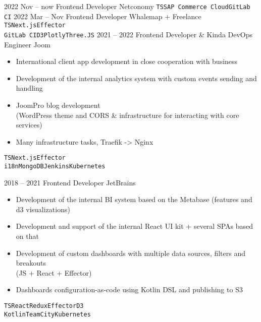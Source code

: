 \documentclass[10pt]{template}
\begin{document}
\begin{entrylist}
    \entry
	{2022 Nov -- now}
	{Frontend Developer}
	{Netconomy}
	{
		\texttt{TS}\slashsep\texttt{SAP Commerce Cloud}\slashsep\texttt{GitLab CI}}
    \entry
	{2022 Mar -- Nov}
	{Frontend Developer}
	{Whalemap + Freelance}
	{
		\texttt{TS}\slashsep\texttt{Next.js}\slashsep\texttt{Effector}\\
		{\color{gray}\texttt{GitLab CI}\slashsep\texttt{D3}\slashsep\texttt{Plotly}\slashsep\texttt{Three.JS}}}
	\entry
	{2021 -- 2022}
	{Frontend Developer \& Kinda DevOps Engineer}
	{Joom}
	{
	        \begin{itemize}[noitemsep,topsep=5pt,leftmargin=8pt]
		        \item International client app development in close cooperation with business
		        \item Development of the internal analytics system with custom events sending and handling
			\item JoomPro blog development\\ (WordPress theme and CORS \& infrastructure for interacting with core services)
		        \item Many infrastructure tasks, Traefik -> Nginx
		\end{itemize}
		\texttt{TS}\slashsep\texttt{Next.js}\slashsep\texttt{Effector}\\
		{\color{gray}\texttt{i18n}\slashsep\texttt{MongoDB}\slashsep\texttt{Jenkins}\slashsep\texttt{Kubernetes}}}
	\entry
	{2018 -- 2021}
	{Frontend Developer}
	{JetBrains}
	{
	        \begin{itemize}[noitemsep,topsep=5pt,leftmargin=8pt]
		        \item Development of the internal BI system based on the Metabase (features and d3 visualizations)
		        \item Development and support of the internal React UI kit + several SPAs based on that
		        \item Development of custom dashboards with multiple data sources, filters and breakouts\\ (JS + React + Effector)\\ 
		        \item Dashboards configuration-as-code using Kotlin DSL and publishing to S3
		\end{itemize}
		\texttt{TS}\slashsep\texttt{React}\slashsep\texttt{Redux}\slashsep\texttt{Effector}\slashsep\texttt{D3}\\
		{\color{gray} \texttt{Kotlin}\slashsep\texttt{TeamCity}\slashsep\texttt{Kubernetes}}}
\end{entrylist}
\end{document}
